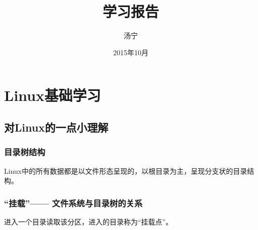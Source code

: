 \documentclass[12pt]{article}
\begin{document}
\title{\vspace{-2em}学习报告\vspace{-0.7em}}
\author{汤宁}
\date{\vspace{-0.7em}2015年10月\vspace{-0.7em}}
\maketitle\thispagestyle{fancy}
\maketitle
\tableofcontents 

\section{Linux基础学习}
\subsection{对Linux的一点小理解}
\begin{flushleft}
\subsubsection{目录树结构}
Linux中的所有数据都是以文件形态呈现的，以根目录为主，呈现分支状的目录结构。
\end{flushleft}
\subsubsection{“挂载”——{} 文件系统与目录树的关系}
\begin{flushleft}
进入一个目录读取该分区，进入的目录称为“挂载点”。
\end{flushleft}
\end{document}

